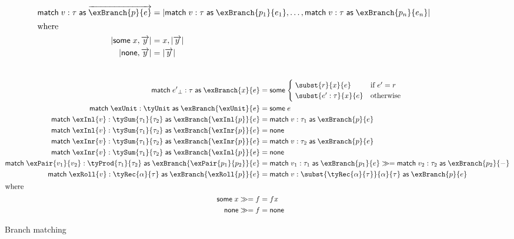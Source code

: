 \begin{figure*}
\begin{align*}
\match{v:\tau}{\vec{\exBranch{p}{e}}}
&=
\catMaybes{\match{v:\tau}{\exBranch{p_1}{e_1}}, \ldots, \match{v:\tau}{\exBranch{p_n}{e_n}}}
\\
\intertext{where}
\catMaybes{\some{x}, \vec{y}}
&=
x, \catMaybes{\vec{y}}
\\
\catMaybes{\none, \vec{y}}
&=
\catMaybes{\vec{y}}
\end{align*}
\\
\begin{align*}
\match{\exSuspend{e'}:\tau}{\exBranch{x}{e}}
&=
\some{
\begin{cases}
\;\subst{r}{x}{e}
&
\text{if }e' = r
\\
\;\subst{\exAnnot{e'}{\tau}}{x}{e}
& \text{otherwise}
\end{cases}
}
\\
\match{\exUnit:\tyUnit}{\exBranch{\exUnit}{e}}
&=
\some{e}
\\
\match{\exInl{v}:\tySum{\tau_1}{\tau_2}}{\exBranch{\exInl{p}}{e}}
&=
\match{v:\tau_1}{\exBranch{p}{e}}
\\
\match{\exInl{v}:\tySum{\tau_1}{\tau_2}}{\exBranch{\exInr{p}}{e}}
&=
\none
\\
\match{\exInr{v}:\tySum{\tau_1}{\tau_2}}{\exBranch{\exInr{p}}{e}}
&=
\match{v:\tau_2}{\exBranch{p}{e}}
\\
\match{\exInr{v}:\tySum{\tau_1}{\tau_2}}{\exBranch{\exInl{p}}{e}}
&=
\none
\\
\match{\exPair{v_1}{v_2}:\tyProd{\tau_1}{\tau_2}}{\exBranch{\exPair{p_1}{p_2}}{e}}
&=
\match{v_1:\tau_1}{\exBranch{p_1}{e}} \bind \match{v_2:\tau_2}{\exBranch{p_2}{-}}
\\
\match{\exRoll{v}:\tyRec{\alpha}{\tau}}{\exBranch{\exRoll{p}}{e}}
&=
\match{v:\subst{\tyRec{\alpha}{\tau}}{\alpha}{\tau}}{\exBranch{p}{e}}
\\
\intertext{where}
\some{x} \bind f
&= f x
\\
\none \bind f
&= \none
\end{align*}
\caption{Branch matching}
\label{fig:match}
\end{figure*}
